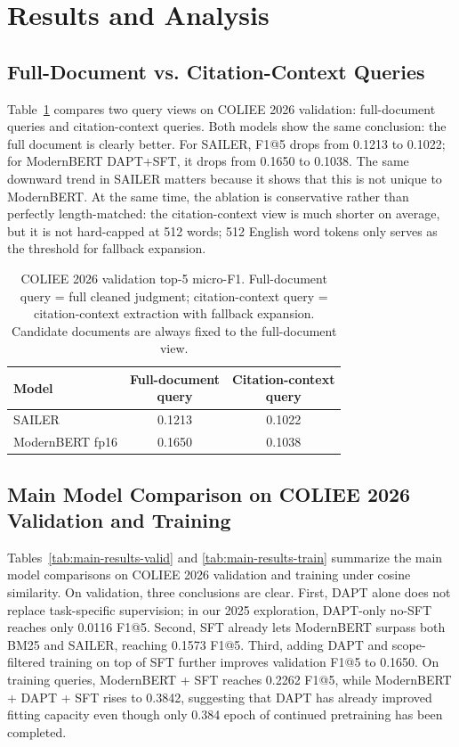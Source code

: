 \section{Results and Analysis}

\subsection{Full-Document vs. Citation-Context Queries}

Table~\ref{tab:query-ablation} compares two query views on COLIEE 2026 validation: full-document queries and citation-context queries. Both models show the same conclusion: the full document is clearly better. For SAILER, F1@5 drops from 0.1213 to 0.1022; for ModernBERT DAPT+SFT, it drops from 0.1650 to 0.1038. The same downward trend in SAILER matters because it shows that this is not unique to ModernBERT. At the same time, the ablation is conservative rather than perfectly length-matched: the citation-context view is much shorter on average, but it is not hard-capped at 512 words; 512 English word tokens only serves as the threshold for fallback expansion.

\begin{table}[t]
  \centering
  \small
  \begin{tabular}{lcc}
    \toprule
    Model & \shortstack{Full-document\\query} & \shortstack{Citation-context\\query} \\
    \midrule
    SAILER & 0.1213 & 0.1022 \\
    ModernBERT fp16 & 0.1650 & 0.1038 \\
    \bottomrule
  \end{tabular}
  \caption{COLIEE 2026 validation top-5 micro-F1. Full-document query = full cleaned judgment; citation-context query = citation-context extraction with fallback expansion. Candidate documents are always fixed to the full-document view.}
  \label{tab:query-ablation}
\end{table}

\subsection{Main Model Comparison on COLIEE 2026 Validation and Training}

Tables~\ref{tab:main-results-valid} and \ref{tab:main-results-train} summarize the main model comparisons on COLIEE 2026 validation and training under cosine similarity. On validation, three conclusions are clear. First, DAPT alone does not replace task-specific supervision; in our 2025 exploration, DAPT-only no-SFT reaches only 0.0116 F1@5. Second, SFT already lets ModernBERT surpass both BM25 and SAILER, reaching 0.1573 F1@5. Third, adding DAPT and scope-filtered training on top of SFT further improves validation F1@5 to 0.1650. On training queries, ModernBERT + SFT reaches 0.2262 F1@5, while ModernBERT + DAPT + SFT rises to 0.3842, suggesting that DAPT has already improved fitting capacity even though only 0.384 epoch of continued pretraining has been completed.

